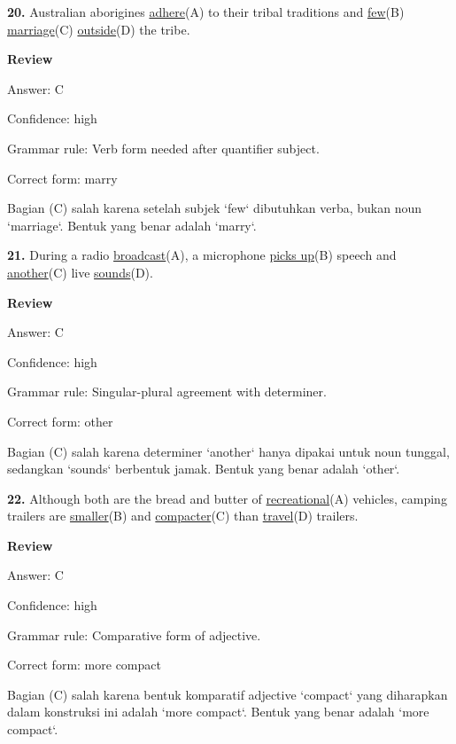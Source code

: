 \documentclass[12pt]{article}
\begin{document}
\endgroup
\par
\vspace{\questionblockgap}
\noindent\textbf{20.} Australian aborigines \uline{adhere}(A) to their tribal traditions and \uline{few}(B) \uline{marriage}(C) \uline{outside}(D) the tribe.
\par
\begingroup
\setlength{\parskip}{0pt}
\setlength{\parindent}{0pt}
\textbf{Review}\par
Answer: C\par
Confidence: high\par
Grammar rule: Verb form needed after quantifier subject.\par
Correct form: marry\par
Bagian (C) salah karena setelah subjek `few` dibutuhkan verba, bukan noun `marriage`. Bentuk yang benar adalah `marry`.\par
\endgroup
\par
\vspace{\questionblockgap}
\noindent\textbf{21.} During a radio \uline{broadcast}(A), a microphone \uline{picks up}(B) speech and \uline{another}(C) live \uline{sounds}(D).
\par
\begingroup
\setlength{\parskip}{0pt}
\setlength{\parindent}{0pt}
\textbf{Review}\par
Answer: C\par
Confidence: high\par
Grammar rule: Singular-plural agreement with determiner.\par
Correct form: other\par
Bagian (C) salah karena determiner `another` hanya dipakai untuk noun tunggal, sedangkan `sounds` berbentuk jamak. Bentuk yang benar adalah `other`.\par
\endgroup
\par
\vspace{\questionblockgap}
\noindent\textbf{22.} Although both are the bread and butter of \uline{recreational}(A) vehicles, camping trailers are \uline{smaller}(B) and \uline{compacter}(C) than \uline{travel}(D) trailers.
\par
\begingroup
\setlength{\parskip}{0pt}
\setlength{\parindent}{0pt}
\textbf{Review}\par
Answer: C\par
Confidence: high\par
Grammar rule: Comparative form of adjective.\par
Correct form: more compact\par
Bagian (C) salah karena bentuk komparatif adjective `compact` yang diharapkan dalam konstruksi ini adalah `more compact`. Bentuk yang benar adalah `more compact`.\par
\end{document}
